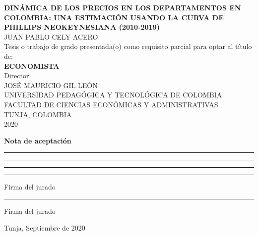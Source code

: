 \newpage
\begin{center}
\thispagestyle{empty}  \textbf{
DINÁMICA DE LOS PRECIOS EN LOS DEPARTAMENTOS EN COLOMBIA: UNA ESTIMACIÓN USANDO LA CURVA DE PHILLIPS NEOKEYNESIANA (2010-2019)}\\[3.5cm]
JUAN PABLO CELY ACERO\\[3.5cm]
\small Tesis o trabajo de grado presentada(o) como requisito parcial para optar al
título de:\\
\textbf{ECONOMISTA}\\[3.5cm]
Director:\\
JOSÉ MAURICIO GIL LEÓN\\[3.5cm]
UNIVERSIDAD PEDAGÓGICA Y TECNOLÓGICA DE COLOMBIA\\
FACULTAD DE CIENCIAS ECONÓMICAS Y ADMINISTRATIVAS\\
TUNJA, COLOMBIA\\
2020\\
\end{center}
\newpage
\begin{center}


\centering
\thispagestyle{empty} \textbf{Nota de aceptación}

\vspace{3cm}

\centering 
\rule{80mm}{0.1mm} 

\vspace{1cm}

\rule{80mm}{0.1mm} 

\vspace{1cm}

\rule{80mm}{0.1mm} 

\vspace{3cm}

\rule{80mm}{0.1mm} 

Firma del jurado

\vspace{2cm}

\rule{80mm}{0.1mm}

Firma del jurado

\vspace{5cm}

Tunja, Septiembre de 2020


\end{center}

\newpage
